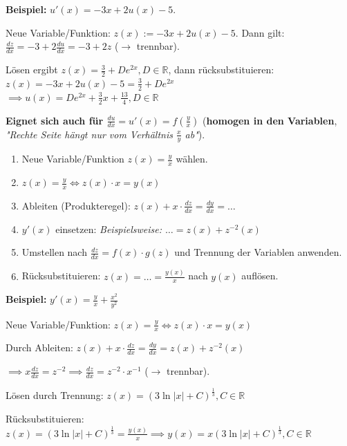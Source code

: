 \begin{exercise}
    \textbf{Beispiel:} $u'(x)=-3x+2u(x)-5$. 
    
    Neue Variable/Funktion: $z(x):=-3x+2u(x)-5$. 
    Dann gilt: $\frac{dz}{dx} = -3 + 2 \frac{du}{dx} = -3 + 2z$ ($\rightarrow$ trennbar).
    
    Lösen ergibt $z(x)=\frac{3}{2}+De^{2x}, D \in \mathbb{R}$, dann rücksubstituieren: $z(x)=-3x+2u(x)-5=\frac{3}{2}+De^{2x}$\\
    $\implies u(x)=De^{2x} + \frac{3}{2}x + \frac{13}{4}, D \in \mathbb{R}$
\end{exercise}

\textbf{Eignet sich auch für $\frac{du}{dx}=u'(x)=f(\frac{y}{x})$} (\textbf{homogen in den Variablen}, \textit{"Rechte Seite hängt nur vom Verhältnis $\frac{x}{y}$ ab"}).

\begin{enumerate}
    \item Neue Variable/Funktion $z(x)=\frac{y}{x}$ wählen.
    \item $z(x)=\frac{y}{x} \iff z(x)\cdot x = y(x)$
    \item Ableiten (Produkteregel): $z(x)+ x \cdot \frac{dz}{dx}=\frac{dy}{dx}=\dots$
    \item $y'(x)$ einsetzen: \textit{Beispielsweise: $\dots=z(x)+z^{-2}(x)$}
    \item Umstellen nach $\frac{dz}{dx}= f(x)\cdot g(z)$ und Trennung der Variablen anwenden.
    \item Rücksubstituieren: $z(x)=\dots=\frac{y(x)}{x}$ nach $y(x)$ auflösen.
\end{enumerate}

\begin{exercise}
    \textbf{Beispiel:} $y'(x)=\frac{y}{x}+\frac{x^2}{y^2}$

    Neue Variable/Funktion: $z(x)=\frac{y}{x}\iff z(x)\cdot x=y(x)$

    Durch Ableiten: $z(x)+x \cdot \frac{dz}{dx}=\frac{dy}{dx}=z(x)+z^{-2}(x)$

    $\implies x \frac{dz}{dx}=z ^{-2} \implies \frac{dz}{dx}=z^{-2}\cdot x^{-1}$ ($\rightarrow$ trennbar).
    
    Lösen durch Trennung: $z(x)=(3 \ln|x|+C)^{\frac{1}{3}}, C \in \mathbb{R}$

    Rücksubstituieren: $z(x)=(3 \ln|x|+C)^{\frac{1}{3}}=\frac{y(x)}{x} \implies y(x)=x(3 \ln|x|+C)^{\frac{1}{3}}, C \in \mathbb{R}$
\end{exercise}


